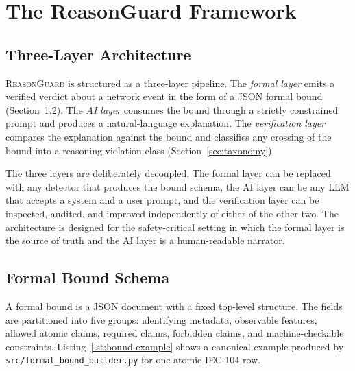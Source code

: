 \chapter{The ReasonGuard Framework}
\label{ch:framework}

\section{Three-Layer Architecture}
\label{sec:architecture}

\textsc{ReasonGuard} is structured as a three-layer pipeline. The
\emph{formal layer} emits a verified verdict about a network event in the
form of a JSON formal bound (Section~\ref{sec:bound-schema}). The
\emph{AI layer} consumes the bound through a strictly constrained prompt and
produces a natural-language explanation. The \emph{verification layer}
compares the explanation against the bound and classifies any crossing of
the bound into a reasoning violation class (Section~\ref{sec:taxonomy}).

The three layers are deliberately decoupled. The formal layer can be
replaced with any detector that produces the bound schema, the AI layer can
be any LLM that accepts a system and a user prompt, and the verification
layer can be inspected, audited, and improved independently of either of the
other two. The architecture is designed for the safety-critical setting in
which the formal layer is the source of truth and the AI layer is a
human-readable narrator.

\section{Formal Bound Schema}
\label{sec:bound-schema}

A formal bound is a JSON document with a fixed top-level structure. The
fields are partitioned into five groups: identifying metadata, observable
features, allowed atomic claims, required claims, forbidden claims, and
machine-checkable constraints. Listing~\ref{lst:bound-example} shows a
canonical example produced by \texttt{src/formal\_bound\_builder.py} for one
atomic IEC-104 row.

